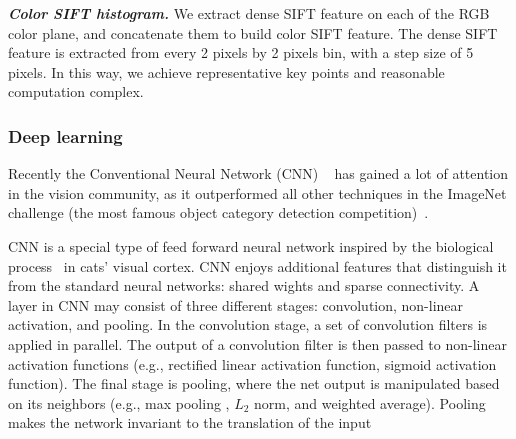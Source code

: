 \textbf{\textit{Color SIFT histogram.}}
We extract dense SIFT feature on each of the RGB color plane, and concatenate them to build color SIFT feature. The dense SIFT feature is extracted from every 2 pixels by 2 pixels bin, with a step size of 5 pixels. In this way, we achieve representative key points and reasonable computation complex. 









\subsubsection{Deep learning}
Recently the Conventional Neural Network (CNN) ~\cite{krizhevsky2012imagenet} has gained a lot of attention in the vision community, as it outperformed all other techniques in the ImageNet challenge (the most famous object category detection competition)~\cite{ilsvrcarxiv14}.



CNN is a special type of feed forward neural network inspired by the biological process~\cite{krizhevsky2012imagenet} in cats' visual cortex. 
CNN enjoys additional features that distinguish it from the standard neural networks: shared wights and sparse connectivity.
A layer in CNN may consist of three different stages: convolution, non-linear activation, and pooling.
In the convolution stage, a set of convolution filters is applied in parallel. 
The output of a convolution filter is then passed to non-linear activation functions (e.g., rectified linear activation function, sigmoid activation function).
The final stage is pooling, where the net output is manipulated based on its neighbors (e.g., max pooling , $L_2$ norm, and weighted average).
Pooling makes the network invariant to the translation of the input

